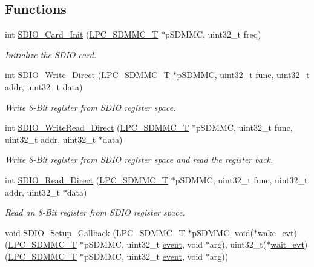 \subsection*{Functions}
\begin{DoxyCompactItemize}
\item 
int \hyperlink{group___s_d_i_o__18_x_x__43_x_x_ga8d72d28a7c358d7cd0f1595e55a60e7e}{S\+D\+I\+O\+\_\+\+Card\+\_\+\+Init} (\hyperlink{struct_l_p_c___s_d_m_m_c___t}{L\+P\+C\+\_\+\+S\+D\+M\+M\+C\+\_\+T} $\ast$p\+S\+D\+M\+MC, uint32\+\_\+t freq)
\begin{DoxyCompactList}\small\item\em Initialize the S\+D\+IO card. \end{DoxyCompactList}\item 
int \hyperlink{group___s_d_i_o__18_x_x__43_x_x_gac6afe352a20f90e630f5a45b808ddf5d}{S\+D\+I\+O\+\_\+\+Write\+\_\+\+Direct} (\hyperlink{struct_l_p_c___s_d_m_m_c___t}{L\+P\+C\+\_\+\+S\+D\+M\+M\+C\+\_\+T} $\ast$p\+S\+D\+M\+MC, uint32\+\_\+t func, uint32\+\_\+t addr, uint32\+\_\+t data)
\begin{DoxyCompactList}\small\item\em Write 8-\/\+Bit register from S\+D\+IO register space. \end{DoxyCompactList}\item 
int \hyperlink{group___s_d_i_o__18_x_x__43_x_x_gab98c1fffe319cb2353c6a220365eca49}{S\+D\+I\+O\+\_\+\+Write\+Read\+\_\+\+Direct} (\hyperlink{struct_l_p_c___s_d_m_m_c___t}{L\+P\+C\+\_\+\+S\+D\+M\+M\+C\+\_\+T} $\ast$p\+S\+D\+M\+MC, uint32\+\_\+t func, uint32\+\_\+t addr, uint32\+\_\+t $\ast$data)
\begin{DoxyCompactList}\small\item\em Write 8-\/\+Bit register from S\+D\+IO register space and read the register back. \end{DoxyCompactList}\item 
int \hyperlink{group___s_d_i_o__18_x_x__43_x_x_gab87874960f2ffedc091b12a6021c7424}{S\+D\+I\+O\+\_\+\+Read\+\_\+\+Direct} (\hyperlink{struct_l_p_c___s_d_m_m_c___t}{L\+P\+C\+\_\+\+S\+D\+M\+M\+C\+\_\+T} $\ast$p\+S\+D\+M\+MC, uint32\+\_\+t func, uint32\+\_\+t addr, uint32\+\_\+t $\ast$data)
\begin{DoxyCompactList}\small\item\em Read an 8-\/\+Bit register from S\+D\+IO register space. \end{DoxyCompactList}\item 
void \hyperlink{group___s_d_i_o__18_x_x__43_x_x_ga27a173a6ad1e2d681abaa8e95dddab69}{S\+D\+I\+O\+\_\+\+Setup\+\_\+\+Callback} (\hyperlink{struct_l_p_c___s_d_m_m_c___t}{L\+P\+C\+\_\+\+S\+D\+M\+M\+C\+\_\+T} $\ast$p\+S\+D\+M\+MC, void($\ast$\hyperlink{sdio__18xx__43xx_8c_a9d3ec75d1e15b0334b5f0bef82ada6b0}{wake\+\_\+evt})(\hyperlink{struct_l_p_c___s_d_m_m_c___t}{L\+P\+C\+\_\+\+S\+D\+M\+M\+C\+\_\+T} $\ast$p\+S\+D\+M\+MC, uint32\+\_\+t \hyperlink{structevent}{event}, void $\ast$arg), uint32\+\_\+t($\ast$\hyperlink{sdio__18xx__43xx_8c_a6dbe39293b06ee6af0be7c83ed3fa71f}{wait\+\_\+evt})(\hyperlink{struct_l_p_c___s_d_m_m_c___t}{L\+P\+C\+\_\+\+S\+D\+M\+M\+C\+\_\+T} $\ast$p\+S\+D\+M\+MC, uint32\+\_\+t \hyperlink{structevent}{event}, void $\ast$arg))

\end{DoxyCompactItemize}
